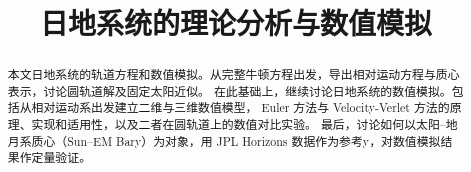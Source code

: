 \documentclass[12pt,a4paper]{ctexrep}
\title{日地系统的理论分析与数值模拟}
\author{}
\date{}
\begin{document}
\maketitle

\begin{abstract}
本文日地系统的轨道方程和数值模拟。从完整牛顿方程出发，导出相对运动方程与质心表示，讨论圆轨道解及固定太阳近似。
在此基础上，继续讨论日地系统的数值模拟。包括从相对运动系出发建立二维与三维数值模型，
 Euler 方法与 Velocity-Verlet 方法的原理、实现和适用性，以及二者在圆轨道上的数值对比实验。
 最后，讨论如何以太阳--地月系质心（Sun--EM Bary）为对象，用 JPL Horizons 数据作为参考y，对数值模拟结果作定量验证。
\end{abstract}

\tableofcontents








\end{document}
